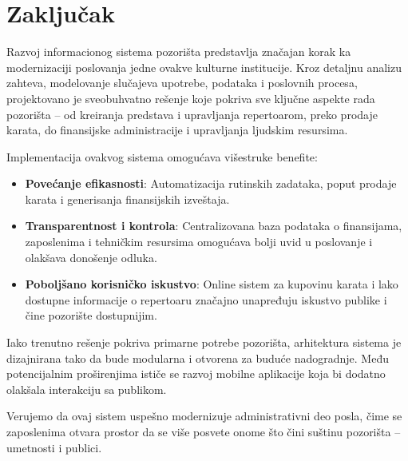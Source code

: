 \section{Zaključak}

Razvoj informacionog sistema pozorišta predstavlja značajan korak ka modernizaciji poslovanja jedne ovakve kulturne institucije. Kroz detaljnu analizu zahteva, modelovanje slučajeva upotrebe, podataka i poslovnih procesa, projektovano je sveobuhvatno rešenje koje pokriva sve ključne aspekte rada pozorišta – od kreiranja predstava i upravljanja repertoarom, preko prodaje karata, do finansijske administracije i upravljanja ljudskim resursima.

Implementacija ovakvog sistema omogućava višestruke benefite:
\begin{itemize}
    \item \textbf{Povećanje efikasnosti}: Automatizacija rutinskih zadataka, poput prodaje karata i generisanja finansijskih izveštaja.
    \item \textbf{Transparentnost i kontrola}: Centralizovana baza podataka o finansijama, zaposlenima i tehničkim resursima omogućava bolji uvid u poslovanje i olakšava donošenje odluka.
    \item \textbf{Poboljšano korisničko iskustvo}: Online sistem za kupovinu karata i lako dostupne informacije o repertoaru značajno unapređuju iskustvo publike i čine pozorište dostupnijim.
\end{itemize}

Iako trenutno rešenje pokriva primarne potrebe pozorišta, arhitektura sistema je dizajnirana tako da bude modularna i otvorena za buduće nadogradnje. Među potencijalnim proširenjima ističe se razvoj mobilne aplikacije koja bi dodatno olakšala interakciju sa publikom.

Verujemo da ovaj sistem uspešno modernizuje administrativni deo posla, čime se zaposlenima otvara prostor da se više posvete onome što čini suštinu pozorišta – umetnosti i publici.
